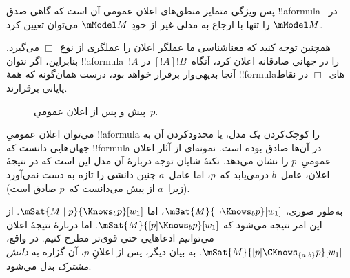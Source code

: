\documentclass[../../../include/open-logic-section]{subfiles}
\begin{document}
پس ویژگی متمایز منطق‌های اعلان عمومی آن است که گاهی صدق
!!a{formula} در~$\mModel M$ را تنها با ارجاع به مدلی غیر از خودِ
$\mModel M$ می‌توان تعیین کرد.

همچنین توجه کنید که معناشناسی ما عملگر اعلان را عملگری از نوع~$\Box$
می‌گیرد. بنابراین، اگر نتوان !!a{formula}~$!A$ را در جهانی صادقانه
اعلان کرد، آنگاه~$[!A]!B$ در آنجا بدیهی‌وار برقرار خواهد بود، درست
همان‌گونه که همهٔ !!{formula}های~$\Box$ در نقاط پایانی برقرارند.

\begin{figure}
  \begin{center}
  \end{center}
  \caption{پیش و پس از اعلان عمومیِ~$p$.}
\end{figure}

می‌توان اعلان عمومیِ !!a{formula} را کوچک‌کردن یک مدل، یا محدودکردن
آن به جهان‌هایی دانست که !!{formula} در آن‌ها صادق بوده است.
 نمونه‌ای از آثار اعلان عمومیِ~$p$ را
نشان می‌دهد. نکتهٔ شایان توجه دربارهٔ آن مدل این است که در نتیجهٔ
اعلان، عامل~$b$ درمی‌یابد که~$p$، اما عامل~$a$ چنین دانشی را تازه به
دست نمی‌آورد (زیرا~$a$ از پیش می‌دانست که~$p$ صادق است).

به‌طور صوری، $\mSat{M}{\lnot \Knows_b p}[w_1]$، اما
$\mSat{M \mid p}{\Knows_b p}[w_1]$. از این امر نتیجه می‌شود که
$\mSat{M}{[p] \Knows_b p}[w_1]$. اما دربارهٔ نتیجهٔ اعلان می‌توانیم
ادعاهایی حتی قوی‌تر مطرح کنیم. در واقع،
$\mSat{M}{[p]\CKnows_{\{a,b\}} p}[w_1]$. به بیان دیگر، پس از اعلانِ
$p$، آن گزاره به \emph{دانش مشترک} بدل می‌شود.
\end{document}
